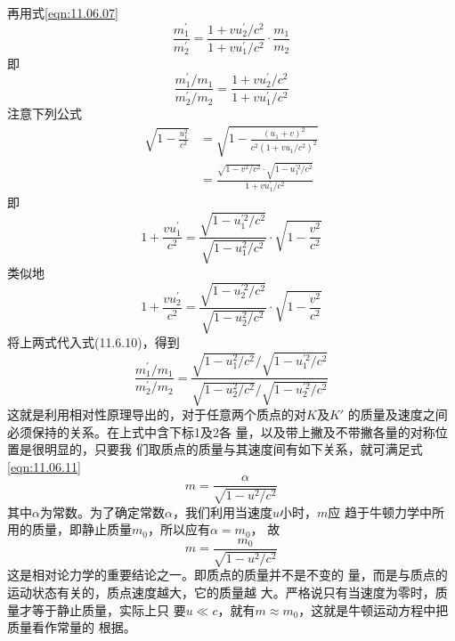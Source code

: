 再用式\eqref{eqn:11.06.07}
\begin{equation*}
    \frac{m_{1}^{\prime}}{m_{2}^{\prime}}=\frac{1+{v u_{2}^{\prime}}/{c^{2}}}{1+{v u_{1}^{\prime}}/{c^{2}}} \cdot \frac{m_{1}}{m_{2}}
\end{equation*}
即\vspace{-1.56em}
\begin{equation}\label{eqn:11.06.10}
    \frac{m_{1}^{\prime} / m_{1}}{m_{2}^{\prime} / m_{2}}=\frac{1+v u_{2}^{\prime} / c^{2}}{1+v u_{1}^{\prime} / c^{2}}
\end{equation}
注意下列公式
\begin{equation*}
    \begin{aligned}
        \sqrt{1-\frac{u_{1}^{2}}{c^{2}}} &=\sqrt{1-\frac{\left(u_{1}+v\right)^{2}}{c^{2}\left(1+v u_{1} / c^{2}\right)^{2}}} \\
        &=\frac{\sqrt{1-v^{2} / c^{2}} \cdot \sqrt{1-u_{1}^{\prime 2} / c^{2}}}{1+v u_{1}^{\prime} / c^{2}}
    \end{aligned}
\end{equation*}
\clearpage\noindent
即\vspace{-1.56em}
\begin{equation*}
    1+\frac{v u_{1}^{\prime}}{c^{2}}=\frac{\sqrt{1-u_{1}^{\prime 2} / c^{2}}}{\sqrt{1-u_{1}^{2} / c^{2}}} \cdot \sqrt{1-\frac{v^{2}}{c^{2}}}
\end{equation*}
类似地
\begin{equation*}
    1+\frac{v u_{2}^{\prime}}{c^{2}}=\frac{\sqrt{1-u_{2}^{\prime 2} / c^{2}}}{\sqrt{1-u_{2}^{2} / c^{2}}} \cdot \sqrt{1-\frac{v^{2}}{c^{2}}}
\end{equation*}
将上两式代入式(11.6.10)，得到
\begin{equation}\label{eqn:11.06.11}
    \frac{m_{1}^{\prime} / m_{1}}{m_{2}^{\prime} / m_{2}}=\frac{\sqrt{1-u_{1}^{2} / c^{2}} / \sqrt{1-u_{1}^{\prime 2} / c^{2}}}{\sqrt{1-u_{2}^{2} / c^{2}} / \sqrt{1-u_{2}^{\prime 2} / c^{2}}}
\end{equation}
这就是利用相对性原理导出的，对于任意两个质点的对$ K $及$ K ' $
的质量及速度之间必须保持的关系。在上式中含下标1及2各
量，以及带上撇及不带撇各量的对称位置是很明显的，只要我
们取质点的质量与其速度间有如下关系，就可满足式\eqref{eqn:11.06.11}
\begin{equation*}
    m = \frac { \alpha } { \sqrt { 1 - u ^ { 2 } / c ^ { 2 } } }
\end{equation*}
其中$ \alpha $为常数。为了确定常数$ \alpha $，我们利用当速度$ u $小时，$ m $应
趋于牛顿力学中所用的质量，即静止质量$ m _ 0 $，所以应有$  \alpha = m _ { 0 }  $，
故
\begin{equation}\label{eqn:11.06.12}
    m = \frac { m _ { 0 } } { \sqrt { 1 - u ^ { 2 }  / c ^ { 2 } } }
\end{equation}
这是相对论力学的重要结论之一。即质点的质量并不是不变的
量，而是与质点的运动状态有关的，质点速度越大，它的质量越
大。严格说只有当速度为零时，质量才等于静止质量，实际上只
要$ u \ll c $，就有$ m \approx m _ 0 $，这就是牛顿运动方程中把质量看作常量的
根据。